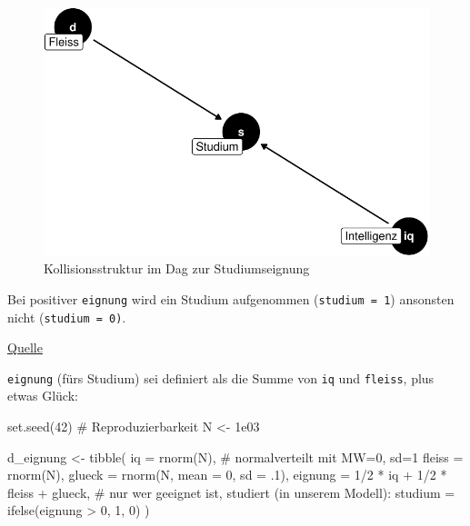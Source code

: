 \documentclass[
  a4paper,
  DIV=11]{scrreprt}
\newenvironment{Shaded}{\begin{snugshade}}{\end{snugshade}}
\newcommand{\AttributeTok}[1]{\textcolor[rgb]{0.40,0.45,0.13}{#1}}
\newcommand{\CommentTok}[1]{\textcolor[rgb]{0.37,0.37,0.37}{#1}}
\newcommand{\DecValTok}[1]{\textcolor[rgb]{0.68,0.00,0.00}{#1}}
\newcommand{\FloatTok}[1]{\textcolor[rgb]{0.68,0.00,0.00}{#1}}
\newcommand{\FunctionTok}[1]{\textcolor[rgb]{0.28,0.35,0.67}{#1}}
\newcommand{\NormalTok}[1]{\textcolor[rgb]{0.00,0.23,0.31}{#1}}
\newcommand{\OtherTok}[1]{\textcolor[rgb]{0.00,0.23,0.31}{#1}}
\newcommand{\SpecialCharTok}[1]{\textcolor[rgb]{0.37,0.37,0.37}{#1}}
\theoremstyle{definition}
\theoremstyle{remark}
\begin{document}
\begin{figure}

{\centering \includegraphics{./kausal_files/figure-pdf/fig-coll3-dag-1.pdf}

}

\caption{\label{fig-coll3-dag}Kollisionsstruktur im Dag zur
Studiumseignung}

\end{figure}

Bei positiver \texttt{eignung} wird ein Studium aufgenommen
(\texttt{studium\ =\ 1}) ansonsten nicht (\texttt{studium\ =\ 0)}.

\href{https://data-se.netlify.app/2020/04/16/simulation-berkson-s-paradox/}{Quelle}

\texttt{eignung} (fürs Studium) sei definiert als die Summe von
\texttt{iq} und \texttt{fleiss}, plus etwas Glück:

\begin{Shaded}
\begin{Highlighting}[]
\FunctionTok{set.seed}\NormalTok{(}\DecValTok{42}\NormalTok{)  }\CommentTok{\# Reproduzierbarkeit}
\NormalTok{N }\OtherTok{\textless{}{-}} \FloatTok{1e03}  

\NormalTok{d\_eignung }\OtherTok{\textless{}{-}}
\FunctionTok{tibble}\NormalTok{(}
  \AttributeTok{iq =} \FunctionTok{rnorm}\NormalTok{(N),  }\CommentTok{\# normalverteilt mit MW=0, sd=1}
  \AttributeTok{fleiss =} \FunctionTok{rnorm}\NormalTok{(N),}
  \AttributeTok{glueck =} \FunctionTok{rnorm}\NormalTok{(N, }\AttributeTok{mean =} \DecValTok{0}\NormalTok{, }\AttributeTok{sd =}\NormalTok{ .}\DecValTok{1}\NormalTok{),}
  \AttributeTok{eignung =} \DecValTok{1}\SpecialCharTok{/}\DecValTok{2} \SpecialCharTok{*}\NormalTok{ iq }\SpecialCharTok{+} \DecValTok{1}\SpecialCharTok{/}\DecValTok{2} \SpecialCharTok{*}\NormalTok{ fleiss }\SpecialCharTok{+}\NormalTok{ glueck,}
  \CommentTok{\# nur wer geeignet ist, studiert (in unserem Modell):}
  \AttributeTok{studium =} \FunctionTok{ifelse}\NormalTok{(eignung }\SpecialCharTok{\textgreater{}} \DecValTok{0}\NormalTok{, }\DecValTok{1}\NormalTok{, }\DecValTok{0}\NormalTok{) }
\NormalTok{  )}
\end{Highlighting}
\end{Shaded}
\end{document}
